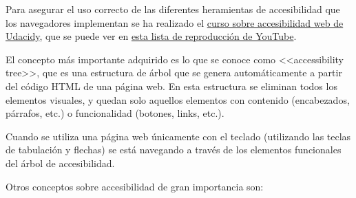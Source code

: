 Para asegurar el uso correcto de las diferentes heramientas de accesibilidad que
los navegadores implementan se ha realizado el
\href{https://www.udacity.com/course/web-accessibility--ud891}{curso sobre
accesibilidad web de Udacidy}, que se puede ver en
\href{https://www.youtube.com/playlist?list=PLcJAkgdenpsci0IJziU4bCk3dTQLpJU7R}{esta
lista de reproducción de YouTube}.

El concepto más importante adquirido es lo que se conoce como <<accessibility
tree>>, que es una estructura de árbol que se genera automáticamente a partir
del código HTML de una página web. En esta estructura se eliminan todos los
elementos visuales, y quedan solo aquellos elementos con contenido (encabezados,
párrafos, etc.) o funcionalidad (botones, links, etc.).

Cuando se utiliza una página web únicamente con el teclado (utilizando las
teclas de tabulación y flechas) se está navegando a través de los elementos
funcionales del árbol de accesibilidad.

Otros conceptos sobre accesibilidad de gran importancia son:

